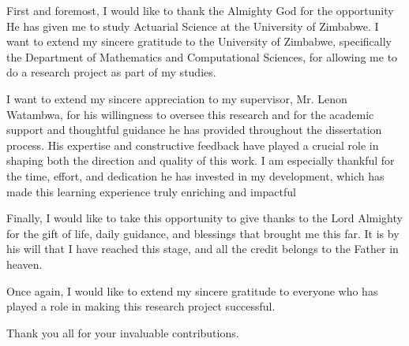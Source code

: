\documentclass[12pt,a4paper]{extreport}
\begin{document}
First and foremost, I would like to thank the Almighty God for the opportunity He has given me to study Actuarial Science at the University of Zimbabwe. I want to extend my sincere gratitude to the University of Zimbabwe, specifically the Department of Mathematics and Computational Sciences, for allowing me to do a research project as part of my studies. 

I want to extend my sincere appreciation to my supervisor, Mr. Lenon Watambwa, for his willingness to oversee this research and for the academic support and thoughtful guidance he has provided throughout the dissertation process. His expertise and constructive feedback have played a crucial role in shaping both the direction and quality of this work. I am especially thankful for the time, effort, and dedication he has invested in my development, which has made this learning experience truly enriching and impactful 

Finally, I would like to take this opportunity to give thanks to the Lord Almighty for the gift of life, daily guidance, and blessings that brought me this far. It is by his will that I have reached this stage, and all the credit belongs to the Father in heaven.  

Once again, I would like to extend my sincere gratitude to everyone who has played a role in making this research project successful. 

Thank you all for your invaluable contributions.
\end{document}
